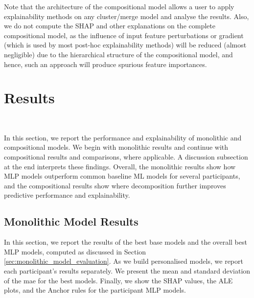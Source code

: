 Note that the architecture of the compositional model allows a user to apply explainability methods on any cluster/merge model and analyse the results. Also, we do not compute the SHAP and other explanations on the complete compositional model, as the influence of input feature perturbations or gradient (which is used by most post-hoc explainability methods) will be reduced (almost negligible) due to the hierarchical structure of the compositional model, and hence, such an approach will produce spurious feature importances.




\section{Results}   
\label{sec:depression_results}

In this section, we report the performance and explainability of monolithic and compositional models. We begin with monolithic results and continue with compositional results and comparisons, where applicable. A discussion subsection at the end interprets these findings. Overall, the monolithic results show how MLP models outperform common baseline ML models for several participants, and the compositional results show where decomposition further improves predictive performance and explainability.

\subsection{Monolithic Model Results}

In this section, we report the results of the best base models and the overall best MLP models, computed as discussed in Section \ref{sec:monolithic_model_evaluation}. As we build personalised models, we report each participant's results separately. We present the mean and standard deviation of the \gls{mae} for the best models. Finally, we show the SHAP values, the ALE plots, and the Anchor rules for the participant MLP models.



